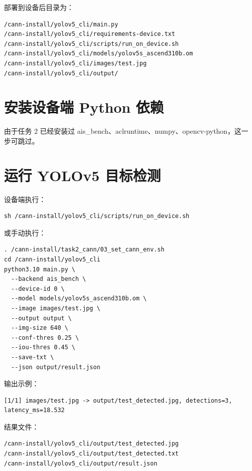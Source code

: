 部署到设备后目录为：

\begin{lstlisting}[caption={设备端目录结构}]
/cann-install/yolov5_cli/main.py
/cann-install/yolov5_cli/requirements-device.txt
/cann-install/yolov5_cli/scripts/run_on_device.sh
/cann-install/yolov5_cli/models/yolov5s_ascend310b.om
/cann-install/yolov5_cli/images/test.jpg
/cann-install/yolov5_cli/output/
\end{lstlisting}


\section{安装设备端 Python 依赖}

由于任务 2 已经安装过 ais\_bench、aclruntime、numpy、opencv-python，这一步可跳过。


\section{运行 YOLOv5 目标检测}

设备端执行：

\begin{lstlisting}[style=shell, caption={一键运行}]
sh /cann-install/yolov5_cli/scripts/run_on_device.sh
\end{lstlisting}

或手动执行：

\begin{lstlisting}[style=shell, caption={手动运行}]
. /cann-install/task2_cann/03_set_cann_env.sh
cd /cann-install/yolov5_cli
python3.10 main.py \
  --backend ais_bench \
  --device-id 0 \
  --model models/yolov5s_ascend310b.om \
  --image images/test.jpg \
  --output output \
  --img-size 640 \
  --conf-thres 0.25 \
  --iou-thres 0.45 \
  --save-txt \
  --json output/result.json
\end{lstlisting}

输出示例：

\begin{lstlisting}[caption={输出示例}]
[1/1] images/test.jpg -> output/test_detected.jpg, detections=3, latency_ms=18.532
\end{lstlisting}

结果文件：

\begin{lstlisting}[caption={结果文件}]
/cann-install/yolov5_cli/output/test_detected.jpg
/cann-install/yolov5_cli/output/test_detected.txt
/cann-install/yolov5_cli/output/result.json
\end{lstlisting}

